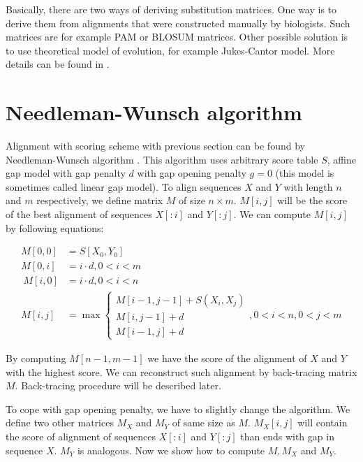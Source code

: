 Basically, there are two ways of deriving substitution matrices. One way is
to derive them from alignments that were constructed manually by biologists. Such
matrices are for example PAM or BLOSUM matrices. Other possible solution is to
use theoretical model of evolution, for example Jukes-Cantor model. More details
can be found in \cite{Durbin1998}.

\section{Needleman-Wunsch algorithm}

Alignment with scoring scheme with previous section can be found by
Needleman-Wunsch algorithm \cite{Durbin1998}.
This algorithm uses arbitrary score table $S$, affine gap model with gap penalty
$d$ with
gap opening penalty $g=0$ (this model is sometimes called linear gap model). To
align sequences $X$ and $Y$ with length $n$ and $m$ respectively, we define
matrix $M$ of size $n\times m$. $M[i,j]$ will be the score of the best alignment
of sequences $X[:i]$ and $Y[:j]$. We can compute $M[i,j]$ by following
equations:

\begin{align} 
M[0,0] &= S[X_0,Y_0]\\
M[0,i] &= i\cdot d, 0< i < m\\\
M[i,0] &= i\cdot d, 0< i < n\\
M[i,j] &= \max
\begin{cases}
 M[i-1,j-1]+S(X_i,X_j)\\M[i,j-1]+d\\
 M[i-1,j]+d
\end{cases}, 0<i<n,0<j<m \label{ALIGN:ALGO:AFFINE}
\end{align}

By computing $M[n-1,m-1]$ we have the score of the alignment of $X$ and $Y$ with
the highest score. We can reconstruct such alignment by back-tracing matrix $M$.
Back-tracing procedure will be described later.

To cope with gap opening penalty, we have to slightly change the algorithm.
We define two other matrices $M_X$ and $M_Y$ of same size as $M$. $M_X[i,j]$
will contain the score of alignment of sequences $X[:i]$ and $Y[:j]$ than ends
with gap in sequence $X$. $M_Y$ is analogous. Now we show how to compute $M,M_X$
and $M_Y$. 


